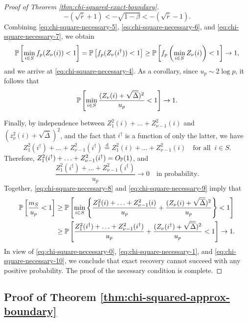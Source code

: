 \begin{proof}[Proof of Theorem \ref{thm:chi-squared-exact-boundary}]
\begin{equation} \label{eq:chi-square-necessary-7}
    -(\sqrt{\overline{r}}+1) < - \sqrt{1-\beta} < - (\sqrt{\overline{r}}-1).
\end{equation}
Combining \eqref{eq:chi-square-necessary-5}, \eqref{eq:chi-square-necessary-6}, and \eqref{eq:chi-square-necessary-7}, we obtain
$$
\P\left[\min_{i\in S} f_p(Z_\nu(i)) < 1\right]
= \P\left[ f_p(Z_\nu(i^\dagger)) < 1 \right] 
\ge \P\left[ f_p\left(\min_{i\in S}Z_\nu(i)\right) < 1 \right] \to 1,
$$
and we arrive at \eqref{eq:chi-square-necessary-4}.
As a corollary, since $u_p\sim2\log{p}$, it follows that
\begin{equation} \label{eq:chi-square-necessary-8}
    \P\left[\min_{i\in S}\frac{(Z_\nu(i) + \sqrt{\overline{\Delta}})^2}{u_p} < 1\right]\to1.
\end{equation}

Finally, by independence between $Z_1^2(i)+\ldots+Z_{\nu-1}^2(i)$ and $(z_\nu^2(i)+\sqrt{\overline{\Delta}})^2$, and the fact that $i^\dagger$ is a function of only the latter, we have
$$
Z_1^2(i^\dagger)+\ldots+Z_{\nu-1}^2(i^\dagger) 
\stackrel{\mathrm{d}}{=} Z_1^2(i)+\ldots+Z_{\nu-1}^2(i) 
\quad \text{for all} \;\; i\in S.
$$
Therefore, $Z_1^2(i^\dagger)+\ldots+Z_{\nu-1}^2(i^\dagger) = O_\P(1)$, and 
\begin{equation} \label{eq:chi-square-necessary-9}
    \frac{Z_1^2(i^\dagger)+\ldots+Z_{\nu-1}^2(i^\dagger)}{u_p} \to 0 \quad \text{in probability}. 
\end{equation}
Together, \eqref{eq:chi-square-necessary-8} and \eqref{eq:chi-square-necessary-9} imply that
\begin{align}
    \P\left[\frac{m_S}{u_p}<1\right]
    &\ge \P\left[\min_{i\in S}\left\{\frac{Z_1^2(i) + \ldots + Z_{\nu-1}^2(i)}{u_p} + \frac{(Z_\nu(i) + \sqrt{\overline{\Delta}})^2}{u_p}\right\} < 1\right] \nonumber \\
    &\ge \P\left[\frac{Z_1^2(i^\dagger) + \ldots + Z_{\nu-1}^2(i^\dagger)}{u_p} + \frac{(Z_\nu(i^\dagger) + \sqrt{\overline{\Delta}})^2}{u_p} < 1\right] \to 1. \label{eq:chi-square-necessary-10}
\end{align}
In view of \eqref{eq:chi-square-necessary-0}, \eqref{eq:chi-square-necessary-1}, and \eqref{eq:chi-square-necessary-10}, we conclude that exact recovery cannot succeed with any positive probability.
The proof of the necessary condition is complete.
\end{proof}

\subsection{Proof of Theorem \ref{thm:chi-squared-approx-boundary}}
\label{subsec:proof-chi-squared-approx-boundary}

